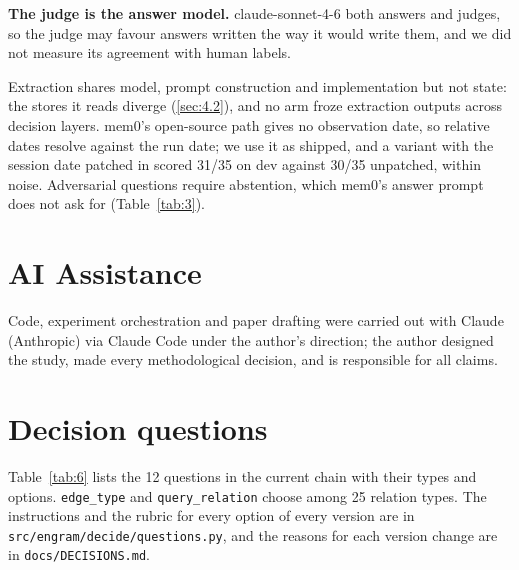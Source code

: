 \documentclass[11pt]{article}
\newcommand{\src}[1]{}
\begin{document}
\textbf{The judge is the answer model.} claude-sonnet-4-6 both answers and judges, so the judge may favour answers written the way it would write them, and we did not measure its agreement with human labels.

Extraction shares model, prompt construction and implementation but not state: the stores it reads diverge (\cref{sec:4.2}), and no arm froze extraction outputs across decision layers. mem0's open-source path gives no observation date, so relative dates resolve against the run date; we use it as shipped, and a variant with the session date patched in scored 31/35\src{bench/results/mem0\_dated\_\_dev.json} on dev against 30/35\src{bench/results/mem0\_\_dev.json} unpatched, within noise. Adversarial questions require abstention, which mem0's answer prompt does not ask for (Table~\ref{tab:3}).

\section*{AI Assistance}
Code, experiment orchestration and paper drafting were carried out with Claude (Anthropic) via Claude Code under the author's direction; the author designed the study, made every methodological decision, and is responsible for all claims.


\appendix
\onecolumn
\FloatBarrier
\section{Decision questions}\label{app:A}
Table~\ref{tab:6} lists the 12\src{src/engram/decide/questions.py (ALL\_QUESTIONS)} questions in the current chain with their types and options. \texttt{edge\_\allowbreak{}type} and \texttt{query\_\allowbreak{}relation} choose among 25\src{src/engram/decide/questions.py (EDGE\_TYPES)} relation types. The instructions and the rubric for every option of every version are in \texttt{src/\allowbreak{}engram/\allowbreak{}decide/\allowbreak{}questions.py}, and the reasons for each version change are in \texttt{docs/\allowbreak{}DECISIONS.md}.
\end{document}
